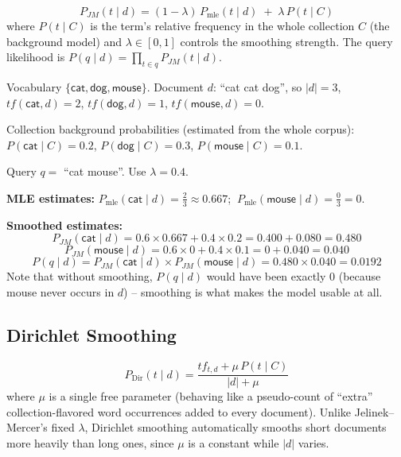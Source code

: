 \documentclass[11pt, a4paper]{article}
\begin{document}
\begin{formulabox}
\[
P_{JM}(t\mid d) = (1-\lambda)\,P_{\text{mle}}(t\mid d) \;+\; \lambda\, P(t\mid C)
\]
where $P(t\mid C)$ is the term's relative frequency in the whole collection $C$ (the background model) and $\lambda\in[0,1]$ controls the smoothing strength. The query likelihood is $P(q\mid d) = \prod_{t\in q} P_{JM}(t\mid d)$.
\end{formulabox}

\begin{examplebox}
Vocabulary $\{\textsf{cat},\textsf{dog},\textsf{mouse}\}$. Document $d$: ``\textsf{cat cat dog}'', so $|d|=3$, $tf(\textsf{cat},d)=2$, $tf(\textsf{dog},d)=1$, $tf(\textsf{mouse},d)=0$.

Collection background probabilities (estimated from the whole corpus): $P(\textsf{cat}\mid C)=0.2$, $P(\textsf{dog}\mid C)=0.3$, $P(\textsf{mouse}\mid C)=0.1$.

Query $q = $ ``\textsf{cat mouse}''. Use $\lambda=0.4$.

\textbf{MLE estimates:} $P_{\text{mle}}(\textsf{cat}\mid d)=\tfrac23\approx0.667$; $\ P_{\text{mle}}(\textsf{mouse}\mid d) = \tfrac03 = 0$.

\textbf{Smoothed estimates:}
\[
P_{JM}(\textsf{cat}\mid d) = 0.6\times0.667 + 0.4\times0.2 = 0.400+0.080 = 0.480
\]
\[
P_{JM}(\textsf{mouse}\mid d) = 0.6\times0 + 0.4\times0.1 = 0+0.040 = 0.040
\]
\[
P(q\mid d) = P_{JM}(\textsf{cat}\mid d)\times P_{JM}(\textsf{mouse}\mid d) = 0.480 \times 0.040 = 0.0192
\]
Note that without smoothing, $P(q\mid d)$ would have been exactly $0$ (because \textsf{mouse} never occurs in $d$) -- smoothing is what makes the model usable at all.
\end{examplebox}

\subsection{Dirichlet Smoothing}

\begin{formulabox}
\[
P_{\text{Dir}}(t\mid d) = \frac{tf_{t,d} + \mu\, P(t\mid C)}{|d| + \mu}
\]
where $\mu$ is a single free parameter (behaving like a pseudo-count of ``extra'' collection-flavored word occurrences added to every document). Unlike Jelinek--Mercer's fixed $\lambda$, Dirichlet smoothing automatically smooths short documents more heavily than long ones, since $\mu$ is a constant while $|d|$ varies.
\end{formulabox}
\end{document}
